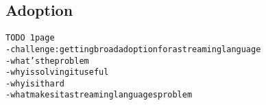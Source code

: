 \subsection{Adoption}\label{sec:adoption} %

\begin{alltt}TODO\scriptsize ~1 page
- challenge: getting broad adoption for a streaming language
- what's the problem
- why is solving it useful
- why is it hard
- what makes it a streaming languages problem
\end{alltt}
